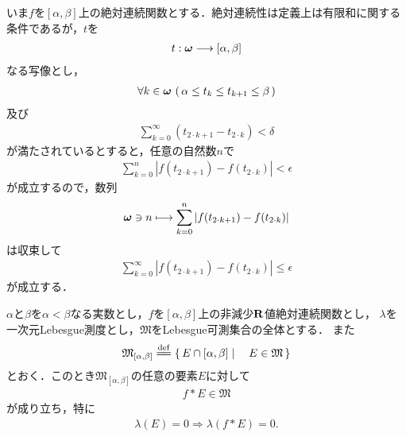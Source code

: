 	いま$f$を$[\alpha,\beta]$上の絶対連続関数とする．絶対連続性は定義上は有限和に関する条件であるが，$t$を
	\begin{align}
		t:{\boldsymbol \omega} \longrightarrow [\alpha,\beta]
	\end{align}
	なる写像とし，
	\begin{align}
		\forall k \in {\boldsymbol \omega}\, \left(\, \alpha \leq t_{k} \leq t_{k+1} \leq \beta\, \right)
	\end{align}
	及び
	\begin{align}
		\sum_{k=0}^{\infty} (t_{2 \cdot k + 1} - t_{2 \cdot k}) < \delta
	\end{align}
	が満たされているとすると，任意の自然数$n$で
	\begin{align}
		\sum_{k=0}^{n} \left|f(t_{2 \cdot k + 1}) - f(t_{2 \cdot k})\right| < \epsilon
	\end{align}
	が成立するので，数列
	\begin{align}
		{\boldsymbol \omega} \ni n \longmapsto \sum_{k=0}^{n} \left|f(t_{2 \cdot k + 1}) - f(t_{2 \cdot k})\right|
	\end{align}
	は収束して
	\begin{align}
		\sum_{k=0}^{\infty} \left|f(t_{2 \cdot k + 1}) - f(t_{2 \cdot k})\right| \leq \epsilon
	\end{align}
	が成立する．
	
	\begin{screen}
		\begin{thm}[$AC$は線型空間である]
		\end{thm}
	\end{screen}
	
	\begin{screen}
		\begin{thm}[絶対連続関数は有界変動である]
		\end{thm}
	\end{screen}
	
	\begin{screen}
		\begin{thm}[絶対連続な非減少関数は可測集合を可測集合に写す]
		\label{thm:absolutely_continuous_functions_map_measurable_set_to_measurable_set}
			$\alpha$と$\beta$を$\alpha<\beta$なる実数とし，$f$を$[\alpha,\beta]$上の非減少$\mathbf{R}$値絶対連続関数とし，
			$\lambda$を一次元Lebesgue測度とし，$\mathfrak{M}$をLebesgue可測集合の全体とする．
			また
			\begin{align}
				\mathfrak{M}_{[\alpha,\beta]} \defeq \Set{E \cap [\alpha,\beta]}{E \in \mathfrak{M}}
			\end{align}
			とおく．このとき$\mathfrak{M}_{[\alpha,\beta]}$の任意の要素$E$に対して
			\begin{align}
				f \ast E \in \mathfrak{M}
			\end{align}
			が成り立ち，特に
			\begin{align}
				\lambda(E) = 0 \Longrightarrow \lambda(f \ast E) = 0.
			\end{align}
		\end{thm}
	\end{screen}
	
